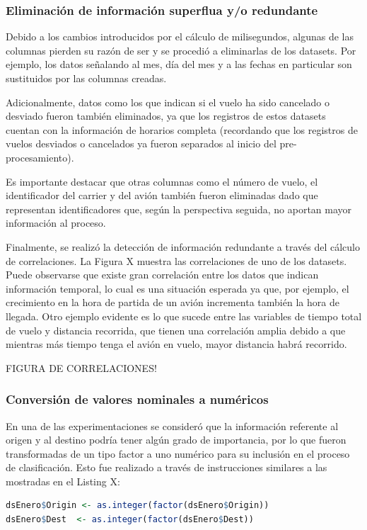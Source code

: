 \documentclass[12pt]{article}
\numberwithin{equation}{section}
\numberwithin{table}{section}
\numberwithin{figure}{section}
\begin{document}
\subsubsection{Eliminación de información superflua y/o redundante}
Debido a los cambios introducidos por el cálculo de milisegundos, algunas de las columnas pierden su razón de ser y se procedió a eliminarlas de los datasets. Por ejemplo, los datos señalando al mes, día del mes y a las fechas en particular son sustituidos por las columnas creadas.


Adicionalmente, datos como los que indican si el vuelo ha sido cancelado o desviado fueron también eliminados, ya que los registros de estos datasets cuentan con la información de horarios completa (recordando que los registros de vuelos desviados o cancelados ya fueron separados al inicio del pre-procesamiento).


Es importante destacar que otras columnas como el número de vuelo, el identificador del carrier y del avión también fueron eliminadas dado que representan identificadores que, según la perspectiva seguida, no aportan mayor información al proceso.


Finalmente, se realizó la detección de información redundante a través del cálculo de correlaciones. 
La Figura X muestra las correlaciones de uno de los datasets.
Puede observarse que existe gran correlación entre los datos que indican información temporal, lo cual es una situación esperada ya que, por ejemplo, el crecimiento en la hora de partida de un avión incrementa también la hora de llegada.
Otro ejemplo evidente es lo que sucede entre las variables de tiempo total de vuelo y distancia recorrida, que tienen una correlación amplia debido a que mientras más tiempo tenga el avión en vuelo, mayor distancia habrá recorrido.

FIGURA DE CORRELACIONES!

\subsubsection{Conversión de valores nominales a numéricos}
En una de las experimentaciones se consideró que la información referente al origen y al destino podría tener algún grado de importancia, por lo que fueron transformadas de un tipo factor a uno numérico para su inclusión en el proceso de clasificación.
Esto fue realizado a través de instrucciones similares a las mostradas en el Listing X:

\begin{lstlisting}[language=R, caption=Conversión de valores nominales (factor) a numérico]
dsEnero$Origin <- as.integer(factor(dsEnero$Origin))
dsEnero$Dest  <- as.integer(factor(dsEnero$Dest))
\end{lstlisting}
\end{document}
